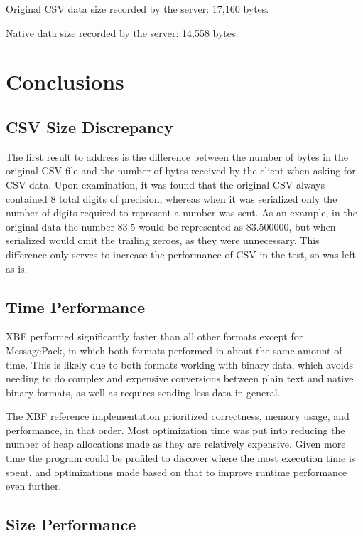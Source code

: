 \documentclass[conference]{IEEEtran}
\begin{document}
Original CSV data size recorded by the server: 17,160 bytes.

Native data size recorded by the server: 14,558 bytes.

\section{Conclusions}

\subsection{CSV Size Discrepancy}

The first result to address is the difference between the number of bytes in the original CSV file and the number of bytes received by the client when asking for CSV data. Upon examination, it was found that the original CSV always contained 8 total digits of precision, whereas when it was serialized only the number of digits required to represent a number was sent. As an example, in the original data the number 83.5 would be represented as 83.500000, but when serialized would omit the trailing zeroes, as they were unnecessary. This difference only serves to increase the performance of CSV in the test, so was left as is.

\subsection{Time Performance}

XBF performed significantly faster than all other formats except for MessagePack, in which both formats performed in about the same amount of time. This is likely due to both formats working with binary data, which avoids needing to do complex and expensive conversions between plain text and native binary formats, as well as requires sending less data in general.

The XBF reference implementation prioritized correctness, memory usage, and performance, in that order. Most optimization time was put into reducing the number of heap allocations made as they are relatively expensive. Given more time the program could be profiled to discover where the most execution time is spent, and optimizations made based on that to improve runtime performance even further.

\subsection{Size Performance}
\end{document}
